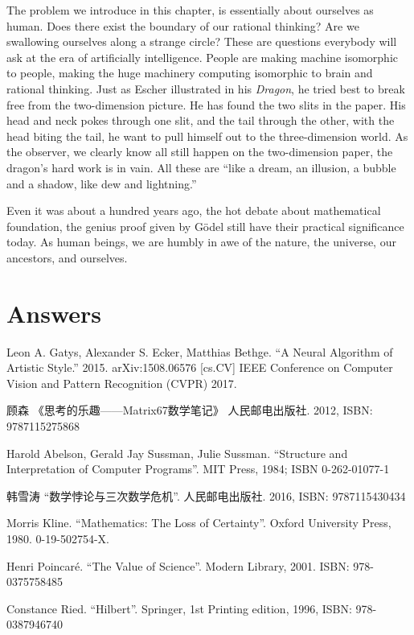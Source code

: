 \documentclass[b5paper]{article}
\begin{document}
The problem we introduce in this chapter, is essentially about ourselves as human. Does there exist the boundary of our rational thinking? Are we swallowing ourselves along a strange circle? These are questions everybody will ask at the era of artificially intelligence. People are making machine isomorphic to people, making the huge machinery computing isomorphic to brain and rational thinking. Just as Escher illustrated in his {\em Dragon}, he tried best to break free from the two-dimension picture. He has found the two slits in the paper. His head and neck pokes through one slit, and the tail through the other, with the head biting the tail, he want to pull himself out to the three-dimension world. As the observer, we clearly know all still happen on the two-dimension paper, the dragon's hard work is in vain. All these are ``like a dream, an illusion, a bubble and a shadow, like dew and lightning.''

Even it was about a hundred years ago, the hot debate about mathematical foundation, the genius proof given by Gödel still have their practical significance today. As human beings, we are humbly in awe of the nature, the universe, our ancestors, and ourselves.

\ifx\wholebook\relax \else
\section{Answers}
\shipoutAnswer

\begin{thebibliography}{99}

Leon A. Gatys, Alexander S. Ecker, Matthias Bethge. ``A Neural Algorithm of Artistic Style.'' 2015. arXiv:1508.06576 [cs.CV] IEEE Conference on Computer Vision and Pattern Recognition (CVPR) 2017.

顾森 《思考的乐趣——Matrix67数学笔记》 人民邮电出版社. 2012, ISBN: 9787115275868

Harold Abelson, Gerald Jay Sussman, Julie Sussman. ``Structure and Interpretation of Computer Programs''. MIT Press, 1984; ISBN 0-262-01077-1

韩雪涛 ``数学悖论与三次数学危机''. 人民邮电出版社. 2016, ISBN: 9787115430434

Morris Kline. ``Mathematics: The Loss of Certainty''. Oxford University Press, 1980. 0-19-502754-X.

Henri Poincaré. ``The Value of Science''. Modern Library, 2001. ISBN: 978-0375758485

Constance Ried. ``Hilbert''. Springer, 1st Printing edition, 1996, ISBN: 978-0387946740

\end{thebibliography}

\expandafter\enddocument

\fi
\end{document}
